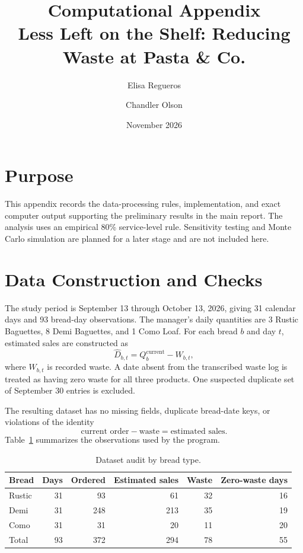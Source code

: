 \documentclass[11pt]{article}
\title{Computational Appendix\\
Less Left on the Shelf: Reducing Waste at Pasta \& Co.}
\author{Elisa Regueros \and Chandler Olson}
\date{November 2026}
\begin{document}
\maketitle

\section{Purpose}

This appendix records the data-processing rules, implementation, and exact
computer output supporting the preliminary results in the main report.  The
analysis uses an empirical 80\% service-level rule.  Sensitivity testing and
Monte Carlo simulation are planned for a later stage and are not included here.

\section{Data Construction and Checks}

The study period is September 13 through October 13, 2026, giving 31 calendar
days and 93 bread-day observations.  The manager's daily quantities are 3
Rustic Baguettes, 8 Demi Baguettes, and 1 Como Loaf.  For each bread $b$ and day
$t$, estimated sales are constructed as
\[
  \widehat D_{b,t}=Q^{\mathrm{current}}_b-W_{b,t},
\]
where $W_{b,t}$ is recorded waste.  A date absent from the transcribed waste
log is treated as having zero waste for all three products.  One suspected
duplicate set of September 30 entries is excluded.

The resulting dataset has no missing fields, duplicate bread-date keys, or
violations of the identity
\[
  \text{current order}-\text{waste}=\text{estimated sales}.
\]
Table~\ref{tab:audit} summarizes the observations used by the program.

\begin{table}[htbp]
\centering
\caption{Dataset audit by bread type.}
\label{tab:audit}
\begin{tabular}{@{}lrrrrr@{}}
\toprule
Bread & Days & Ordered & Estimated sales & Waste & Zero-waste days \\
\midrule
Rustic & 31 & 93  & 61  & 32 & 16 \\
Demi   & 31 & 248 & 213 & 35 & 19 \\
Como   & 31 & 31  & 20  & 11 & 20 \\
\midrule
Total  & 93 & 372 & 294 & 78 & 55 \\
\bottomrule
\end{tabular}
\end{table}
\end{document}
